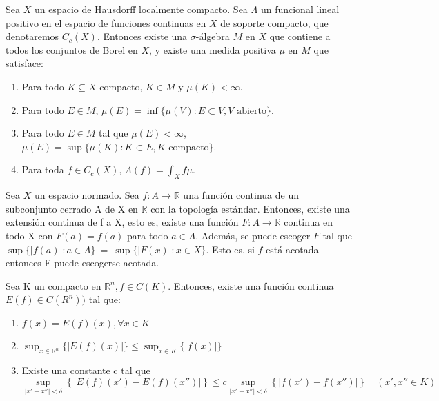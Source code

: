 \begin{teorema}\label{thm:h04}
Sea $X$ un espacio de Hausdorff localmente compacto. Sea $\Lambda$ un funcional lineal positivo en el espacio de funciones continuas en $X$ de soporte compacto, que denotaremos $C_{c}(X)$. Entonces existe una $\sigma$-álgebra $M$ en $X$ que contiene a todos los conjuntos de Borel en $X$, y existe una medida positiva $\mu$ en $M$ que satisface:
\begin{enumerate}
	\item Para todo $K\subseteq X$ compacto, $K\in M$ y $\mu (K)<\infty$.
	\item Para todo $E\in M$, $\mu (E) = \inf\{\mu (V) : E \subset V, V \text{ abierto}\}$.

	\item Para todo $E\in M$ tal que $\mu (E) < \infty$, $\mu (E) = \sup\{\mu (K): K\subset E, K \text{ compacto}\}$.
	\item Para toda $f\in C_{c}(X)$, $\Lambda (f) = \int_{X}f\mu$.
\end{enumerate}
\end{teorema}
\begin{teorema}\label{thm:h07}
 Sea $X$ un espacio normado. Sea \(f:A\to \mathds{R}\) una función continua de un subconjunto cerrado A de X en \(\mathds{R}\) con la topología estándar. Entonces, existe una extensión continua de f a X, esto es, existe una función \(F:A\to \mathbb{R}\) continua en todo X con \(F(a) = f(a)\) para todo \(a\in A\). Además, se puede escoger \(F\) tal que \(\sup\{|f(a)|:a\in A\}~=~\sup\{|F(x)|:x\in X\} \). Esto es, si \(f\) está acotada entonces F puede escogerse acotada.
\end{teorema}


\begin{lema}\label{lm:p01}
Sea K un compacto en \(\mathds{R}^{n}, f \in C(K)\). Entonces, existe una función continua \(E(f)\in C(R^{n}))\) tal que: 
\begin{enumerate}
	\item \(f(x) = E(f)(x), \forall x \in K\)
	\item \( \sup_{x\in \mathds{R}^{n}}\{\vert E(f)(x)\vert\} \leq \sup_{x\in K} \{\vert f(x)\vert\}\)
	\item Existe una constante c tal que \[ \sup_{\vert x'-x''\vert < \delta}\left\{ \vert E(f)(x') - E(f)(x'')\vert \right\} \leq c \sup_{\vert x'-x'' \vert < \delta} \left\{\vert f(x')-f(x'')\vert\right\} \quad ( x',x''\in K)\]
\end{enumerate}
\end{lema}

